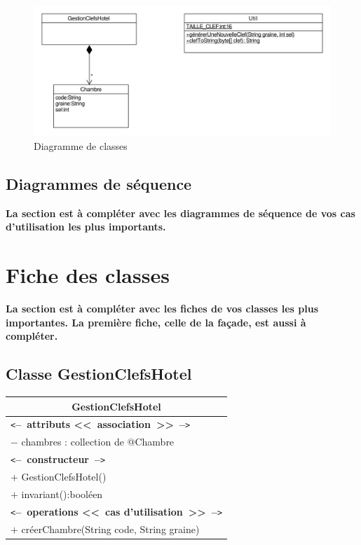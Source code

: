 \documentclass[11pt,article]{article}
\newcommand{\cmt}[1]{\texttt{<}\textbf{--~#1~--}\texttt{>}}
\begin{document}
\begin{figure}[h!]
\begin{center}
\includegraphics[scale=0.6]{DiagrammesDeClasses/gestionclefshotel_uml_diag_classes}
\caption{Diagramme de classes}
\end{center}
\label{umlet_diag_classes}
\end{figure}

\newpage

\subsection{Diagrammes de séquence}

{\color{red}\textbf{La section est à compléter avec les diagrammes de séquence de vos cas d'utilisation les plus importants.}}

\newpage

\section{Fiche des classes}

{\color{red}\textbf{La section est à compléter avec les fiches de vos
    classes les plus importantes. La première fiche, celle de la
    façade, est aussi à compléter.}}

\subsection{Classe \textsf{GestionClefsHotel}}

\begin{center}
\begin{longtable}{|p{15cm}|}
\hline
\multicolumn{1}{|c|}{{\Large \textsf{GestionClefsHotel}}} \\
\hline
\cmt{attributs <<~association~>>}\\
$-$ chambres : collection de @Chambre \\
\hline
\cmt{constructeur} \\
$+$ GestionClefsHotel()\\
$+$ invariant():booléen\\
\cmt{operations <<~cas d'utilisation~>>} \\
$+$ créerChambre(String code, String graine) \\
\hline
\end{longtable}%
\end{center}
\end{document}
